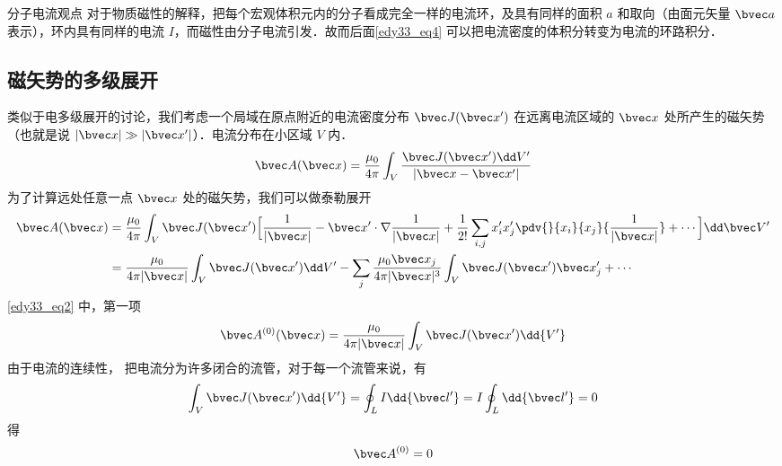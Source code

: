 
\begin{lemma}{分子电流观点}
对于物质磁性的解释，把每个宏观体积元内的分子看成完全一样的电流环，及具有同样的面积 $a$ 和取向（由面元矢量 $\bvec a$ 表示），环内具有同样的电流 $I$，而磁性由分子电流引发．故而后面\autoref{edy33_eq4} 可以把电流密度的体积分转变为电流的环路积分．
\end{lemma}
\subsection{磁矢势的多级展开}
类似于电多级展开的讨论，我们考虑一个局域在原点附近的电流密度分布 $\bvec J(\bvec x')$ 在远离电流区域的 $\bvec x$ 处所产生的磁矢势（也就是说 $|\bvec x|\gg|\bvec x'|$）．电流分布在小区域 $V$ 内．
\begin{equation}
\bvec A(\bvec x)=\dfrac {\mu_0}{4\pi} \int_V \dfrac{ \bvec J(\bvec x^{\prime})\dd V^{\prime}}{|\bvec x - \bvec x'|}\label{edy33_eq1}
\end{equation}
为了计算远处任意一点 $\bvec x$ 处的磁矢势，我们可以做泰勒展开
\begin{equation}\label{edy33_eq2}
\begin{aligned}
\bvec A(\bvec x)&=\dfrac {\mu_0}{4\pi}\int_V \bvec J(\bvec x')\Big[\dfrac{1}{|\bvec x|}-\bvec x'\cdot\nabla \dfrac{1}{|\bvec x|}+\dfrac{1}{2!}\sum_{i,j}x_i^{\prime}x_j^{\prime}\pdv{}{x_i}{x_j}{\dfrac 1 {|\bvec x|}}+\cdots\Big]\dd \bvec V^{\prime}
\\
&=\dfrac{\mu_0}{4\pi|\bvec x|}\int_V \bvec J(\bvec x')\dd V'
-\sum_{j}\dfrac{\mu_0 \bvec x_j}{4\pi |\bvec x|^3}\int_V \bvec J(\bvec x')\bvec x'_j + \cdots
\end{aligned}
\end{equation}
\autoref{edy33_eq2} 中，第一项
\begin{equation}
\bvec A^{(0)}(\bvec x)=\dfrac {\mu_0}{4\pi |\bvec x|}\int_V \bvec J(\bvec x')\dd{ V^{\prime}}\label{edy33_eq3}
\end{equation}
由于电流的连续性，%
把电流分为许多闭合的流管，对于每一个流管来说，有
\begin{equation}
\int_V \bvec J(\bvec x^{\prime}) \dd{V^{\prime}}=\oint_L I\dd{\bvec l'}=I\oint_L \dd{\bvec l'}=0\label{edy33_eq4}
\end{equation}
得\begin{equation}
\bvec A^{(0)}=0\label{edy33_eq5}
\end{equation}
